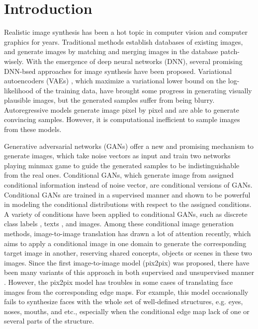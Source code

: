 \section{Introduction}
Realistic image synthesis has been a hot topic in computer vision and computer graphics for years. 
Traditional methods \cite{EBSR, TextureSyn,SceneCompletion} establish databases of existing images, and generate images by matching and merging images in the database patch-wisely. 
With the emergence of deep neural networks (DNN), several promising DNN-bsed approaches for image synthesis have been proposed. 
Variational autoencoders (VAEs) \cite{VAEs}, which maximize a variational lower bound on the log-likelihood of the training data, have brought some progress in generating visually plausible images, but the generated samples suffer from being blurry. 
Autoregressive models \cite{PixelCNN} generate image pixel by pixel and are able to generate convincing samples. However, it is computational inefficient to sample images from these models.
%

Generative adversarial networks (GANs) \cite{GANs} offer a new and promising mechanism to generate images, which take noise vectors as input and train two networks playing minmax game to guide the generated samples to be indistinguishable from the real ones. 
Conditional GANs, which generate image from assigned conditional information instead of noise vector, are conditional versions of GANs. Conditional GANs are trained in a supervised manner and shown to be powerful in modeling the conditional distributions with respect to the assigned conditions. A variety of conditions have been applied to conditional GANs, such as discrete class labels \cite{cGANs}, texts \cite{StackGANs, StackGANs++}, and images.
%
Among these conditional image generation methods, image-to-image translation has drawn a lot of attention recently, which aims to apply a conditional image in one domain to generate the corresponding target image in another, reserving shared concepts, objects or scenes in these two images. Since the first image-to-image model (pix2pix)  \cite{pix2pix} was proposed, there have been many variants of this approach in both supervised and unsupervised manner \cite{CycleGANs, DualGANs,CoupleGANs,BicycleGANs}. %
However, the pix2pix model has troubles in some cases of translating face images from the corresponding edge maps. For example, this model occasionally fails to synthesize faces with the whole set of well-defined structures, e.g. eyes, noses, mouths, and etc., especially when the conditional edge map lack of one or several parts of the structure. 

